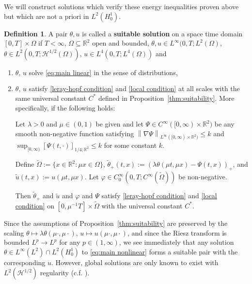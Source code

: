 \documentclass[11pt]{amsart}
\theoremstyle{remark}
\theoremstyle{definition}
\newtheorem{definition}{Definition}
\newcommand{\R}{\mathbb{R}}
\newcommand{\norm}[1]{\left\lVert#1\right\rVert}
\newcommand{\bracket}[1]{\left[ #1 \right]}
\newcommand{\grad}{\nabla}
\newcommand{\n}{^{-1}}
\newcommand{\HD}{\mathcal{H}}
\newcommand{\Csuit}{C^\ast}
\begin{document}
We will construct solutions which verify these energy inequalities proven above but which are not a priori in $L^2(H_0^1)$.  
\begin{definition}
A pair $\theta, u$ is called a \textbf{suitable solution} on a space time domain $[0,T]\times \Omega$ if $T < \infty$, $\Omega \subseteq\R^2$ open and bounded,  $\theta,u \in L^\infty(0,T;L^2(\Omega)$, $\theta \in L^2(0,T;\HD^{1/2}(\Omega))$, $u \in L^4(0,T; L^4(\Omega))$ and
\begin{enumerate}
\item $\theta$, $u$ solve \eqref{eq:main linear} in the sense of distributions, \\
\item $\theta$, $u$ satisfy \eqref{leray-hopf condition} and \eqref{local condition} at all scales with the same universal constant $\Csuit$ defined in Proposition~\ref{thm:suitability}.  More specifically, if the following holds:

Let $\lambda >0$ and $\mu \in (0,1)$ be given and let $\Psi \in C^\infty([0,\infty)\times \R^2)$ be any smooth non-negative function satisfying $\norm{\grad\Psi}_{L^\infty([0,\infty)\times\R^2)} \leq k$ and $\sup_{[0,\infty)} \bracket{\Psi(t,\cdot)}_{1/4; \R^2} \leq k$ for some constant $k$.  

Define $\tilde{\Omega} := \{x \in \R^2: \mu x \in \Omega\}$, $\tilde{\theta}_+(t,x) := (\lambda \theta(\mu t, \mu x)-\Psi(t, x))_+$, and $\tilde{u}(t,x):= u(\mu t, \mu x)$.  Let $\varphi \in C^\infty_0(0,T;C^\infty(\tilde{\Omega}))$ be non-negative.  

Then $\tilde{\theta}_+$ and $\tilde{u}$ and $\varphi$ and $\Psi$ satisfy \eqref{leray-hopf condition} and \eqref{local condition} on $[0,\mu\n T] \times \tilde{\Omega}$ with the universal constant $\Csuit$.  
\end{enumerate}
\end{definition}

Since the assumptions of Proposition~\ref{thm:suitability} are preserved by the scaling $\theta \mapsto \lambda \theta(\mu\cdot, \mu \cdot)$, $u \mapsto u(\mu \cdot, \mu\cdot)$, and since the Riesz transform is bounded $L^p \to L^p$ for any $p \in (1,\infty)$, we see immediately that any solution $\theta \in L^\infty(L^2) \cap L^2(H_0^1)$ to \eqref{eq:main nonlinear} forms a suitable pair with the corresponding $u$.  However, global solutions are only known to exist with $L^2(\HD^{1/2})$ regularity (c.f. \cite{CoIg.fraclap}).  
\end{document}
